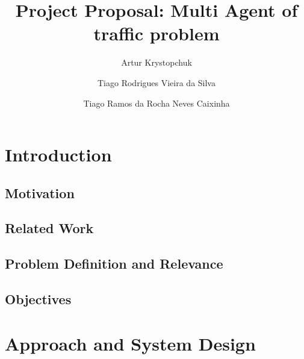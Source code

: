 \documentclass[sigconf,review]{acmart}
\title[Project Proposal]{Project Proposal: Multi Agent of traffic problem}
\author{Artur Krystopchuk}
\affiliation{%
  \institution{Instituto Superior Tecnico}
  \country{Porugal}
  \city{}
}
\author{Tiago Rodrigues Vieira da Silva}
\affiliation{%
  \institution{Instituto Superior Tecnico}
  \country{Porugal}
  \city{}
}
\author{	Tiago Ramos da Rocha Neves Caixinha}
\affiliation{%
  \institution{Instituto Superior Tecnico}
  \country{Porugal}
  \city{}
}
\begin{document}

\maketitle

\section{Introduction}
\label{sec:intro}
\subsection{Motivation}

\subsection{Related Work}

\subsection{Problem Definition and Relevance}

\subsection{Objectives}

\section{Approach and System Design}
\label{sec:approach}

\end{document}
